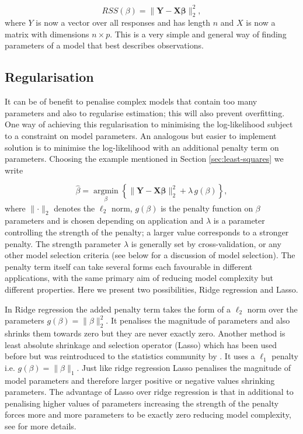 \begin{equation}
  \label{eq:rss-ls}
  RSS(\beta) = \lVert \mathbf{Y} - \mathbf{X}\mathbf{\beta}\lVert^2_2,
\end{equation}
where $Y$ is now a vector over all responses and has length $n$ and $X$ is now a matrix with dimensions $n \times p$. This is a very simple and general way of finding parameters of a model that best describes observations. 

\subsection{Regularisation}
\label{sec:penalisation}

It can be of benefit to penalise complex models that contain too many parameters and also to regularise estimation; this will also prevent overfitting. One way of achieving this regularisation to minimising the log-likelihood subject to a constraint on model parameters. An analogous but easier to implement solution is to minimise the log-likelihood with an additional penalty term on parameters. Choosing the example mentioned in Section \ref{sec:least-squares} we write

\begin{equation}
  \label{eq:pen-log-lik}
  \hat{\beta} = \underset{\beta}{\operatorname{argmin}}  \left\lbrace \lVert \mathbf{Y} - \mathbf{X}\mathbf{\beta}\lVert^2_2 + \lambda\, g(\beta) \right\rbrace,
\end{equation}
where $\lVert  \cdot \rVert_2$ denotes the $\ell_2$ norm, $g(\beta)$ is the penalty function on $\beta$ parameters and is chosen depending on application and $\lambda$ is a parameter controlling the strength of the penalty; a larger value corresponds to a stronger penalty. The strength parameter $\lambda$ is generally set by cross-validation, or any other model selection criteria (see below for a discussion of model selection). The penalty term itself can take several forms each favourable in different applications, with the same primary aim of reducing model complexity but different properties. Here we present two possibilities, Ridge regression and Lasso.

In Ridge regression the added penalty term takes the form of a $\ell_2$ norm over the parameters $g(\beta) = \lVert \beta \rVert_2^2$. It penalises the magnitude of parameters and also shrinks them towards zero but they are never exactly zero. Another method is least absolute shrinkage and selection operator (Lasso) which has been used before but was reintroduced to the statistics community by \cite{Tibshirani:1996wba}. It uses a $\ell_1$ penalty i.e. $g(\beta) = \lVert \beta \rVert_1$. Just like ridge regression Lasso penalises the magnitude of model parameters and therefore larger positive or negative values shrinking parameters. The advantage of Lasso over ridge regression is that in additional to penalising higher values of parameters increasing the strength of the penalty forces more and more parameters to be exactly zero reducing model complexity, see \cite{hastie2001elements} for more details. 

